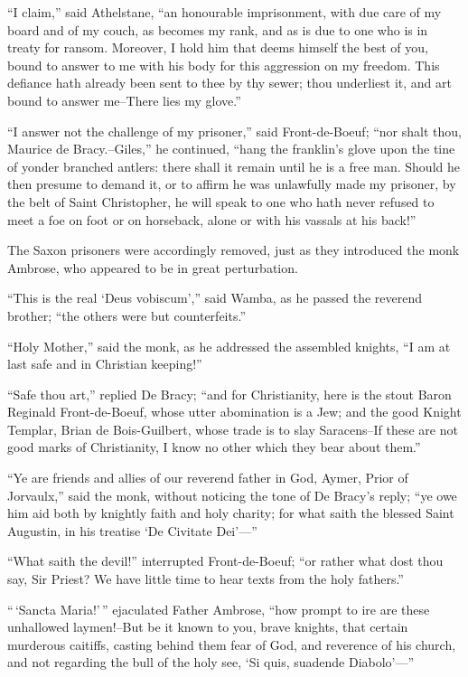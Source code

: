 ``I claim,'' said Athelstane, ``an honourable imprisonment, with due
care of my board and of my couch, as becomes my rank, and as is due to
one who is in treaty for ransom. Moreover, I hold him that deems himself
the best of you, bound to answer to me with his body for this aggression
on my freedom. This defiance hath already been sent to thee by thy
sewer; thou underliest it, and art bound to answer me--There lies my
glove.''

``I answer not the challenge of my prisoner,'' said Front-de-Boeuf;
``nor shalt thou, Maurice de Bracy.--Giles,'' he continued, ``hang the
franklin's glove upon the tine of yonder branched antlers: there shall
it remain until he is a free man. Should he then presume to demand it,
or to affirm he was unlawfully made my prisoner, by the belt of Saint
Christopher, he will speak to one who hath never refused to meet a foe
on foot or on horseback, alone or with his vassals at his back!''

The Saxon prisoners were accordingly removed, just as they introduced
the monk Ambrose, who appeared to be in great perturbation.

``This is the real `Deus vobiscum','' said Wamba, as he passed the
reverend brother; ``the others were but counterfeits.''

``Holy Mother,'' said the monk, as he addressed the assembled knights,
``I am at last safe and in Christian keeping!''

``Safe thou art,'' replied De Bracy; ``and for Christianity, here is the
stout Baron Reginald Front-de-Boeuf, whose utter abomination is a Jew;
and the good Knight Templar, Brian de Bois-Guilbert, whose trade is to
slay Saracens--If these are not good marks of Christianity, I know no
other which they bear about them.''

``Ye are friends and allies of our reverend father in God, Aymer, Prior
of Jorvaulx,'' said the monk, without noticing the tone of De Bracy's
reply; ``ye owe him aid both by knightly faith and holy charity; for
what saith the blessed Saint Augustin, in his treatise `De Civitate
Dei'---''

``What saith the devil!'' interrupted Front-de-Boeuf; ``or rather what
dost thou say, Sir Priest? We have little time to hear texts from the
holy fathers.''

``\,`Sancta Maria!'\,'' ejaculated Father Ambrose, ``how prompt to ire
are these unhallowed laymen!--But be it known to you, brave knights,
that certain murderous caitiffs, casting behind them fear of God, and
reverence of his church, and not regarding the bull of the holy see, `Si
quis, suadende Diabolo'---''

